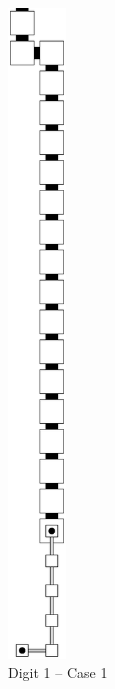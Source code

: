 \begin{itemize}
\begin{figure}[H]
\begin{subfigure}[t]{0.17\textwidth}
                \includegraphics[width=0.17\textwidth]{warping/post_warp_case1_digit1_msr}
                \caption{\label{fig:post_warp_case1_digit1_msr} Digit 1 -- Case 1}
            \end{subfigure}%
            ~
            \begin{subfigure}[t]{0.17\textwidth}
                \centering

\end{subfigure}
\end{figure}
\end{itemize}
